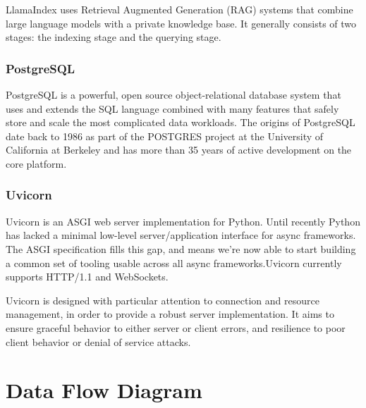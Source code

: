 LlamaIndex uses Retrieval Augmented Generation (RAG) systems that combine large language models with a private knowledge base. It generally consists of two stages: the indexing stage and the querying stage.\cite{datacamp}

\subsubsection{PostgreSQL}

PostgreSQL is a powerful, open source object-relational database system that uses and extends the SQL language combined with many features that safely store and scale the most complicated data workloads. The origins of PostgreSQL date back to 1986 as part of the POSTGRES project at the University of California at Berkeley and has more than 35 years of active development on the core platform.\cite{postgres}

\subsubsection{Uvicorn}
Uvicorn is an ASGI web server implementation for Python. Until recently Python has lacked a minimal low-level server/application interface for async frameworks. The ASGI specification fills this gap, and means we're now able to start building a common set of tooling usable across all async frameworks.Uvicorn currently supports HTTP/1.1 and WebSockets.

Uvicorn is designed with particular attention to connection and resource management, in order to provide a robust server implementation. It aims to ensure graceful behavior to either server or client errors, and resilience to poor client behavior or denial of service attacks.\cite{uvicorn}

\section{Data Flow Diagram}

